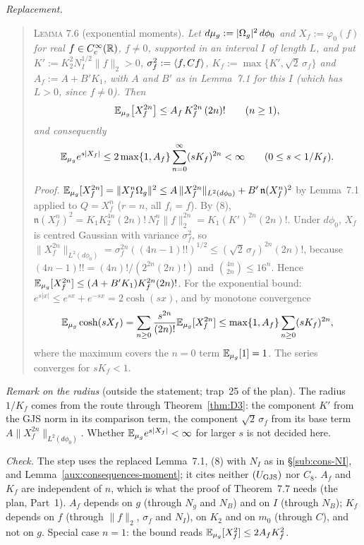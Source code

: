\emph{Replacement.}
\begin{quote}\small
\textsc{Lemma 7.6} (exponential moments).  \emph{Let $d\mu_g:=|\Omega_g|^2\,d\phi_0$ and
$X_f:=\varphi_0(f)$ for real $f\in C_c^\infty(\mathbb{R})$, $f\ne0$, supported in an interval $I$ of
length $L$, and put $K':=K_2^{2}N_I^{1/2}\|f\|_2>0$, $\sigma_f^2:=\langle f,Cf\rangle$,
$K_f:=\max\{K',\sqrt2\,\sigma_f\}$ and $A_f:=A+B'K_1$, with $A$ and $B'$ as in Lemma~7.1 for this
$I$ (which has $L>0$, since $f\ne0$).  Then}
\[
 \mathbb{E}_{\mu_g}\bigl[X_f^{2n}\bigr]\le A_f\,K_f^{2n}\,(2n)!\qquad(n\ge1),
\]
\emph{and consequently}
\[
 \mathbb{E}_{\mu_g}e^{s|X_f|}\le2\max\{1,A_f\}\sum_{n=0}^\infty(sK_f)^{2n}<\infty\qquad(0\le s<1/K_f).
\]

\emph{Proof.}  $\mathbb{E}_{\mu_g}[X_f^{2n}]=\|X_f^n\Omega_g\|^2\le A\,\|X_f^{2n}\|_{L^2(d\phi_0)}+B'\,
\mathfrak n(X_f^n)^2$ by Lemma~7.1 applied to $Q=X_f^n$ ($r=n$, all $f_i=f$).  By (8),
$\mathfrak n(X_f^n)^2=K_1K_2^{4n}(2n)!\,N_I^n\|f\|_2^{2n}=K_1(K')^{2n}(2n)!$.  Under $d\phi_0$,
$X_f$ is centred Gaussian with variance $\sigma_f^2$, so
$\|X_f^{2n}\|_{L^2(d\phi_0)}=\sigma_f^{2n}((4n-1)!!)^{1/2}\le(\sqrt2\,\sigma_f)^{2n}(2n)!$, because
$(4n-1)!!=(4n)!/(2^{2n}(2n)!)$ and $\binom{4n}{2n}\le16^n$.  Hence
$\mathbb{E}_{\mu_g}[X_f^{2n}]\le(A+B'K_1)K_f^{2n}(2n)!$.  For the exponential bound: $e^{s|x|}\le
e^{sx}+e^{-sx}=2\cosh(sx)$, and by monotone convergence
\[
 \mathbb{E}_{\mu_g}\cosh(sX_f)=\sum_{n\ge0}\frac{s^{2n}}{(2n)!}\mathbb{E}_{\mu_g}[X_f^{2n}]
 \le\max\{1,A_f\}\sum_{n\ge0}(sK_f)^{2n},
\]
where the maximum covers the $n=0$ term $\mathbb{E}_{\mu_g}[1]=1$.  The series converges for $sK_f<1$.
\end{quote}
\emph{Remark on the radius} (outside the statement; trap~25 of the plan).  The radius $1/K_f$
comes from the route through Theorem~\ref{thm:D3}: the component $K'$ from the GJS norm in its
comparison term, the component $\sqrt2\,\sigma_f$ from its base term $A\|X_f^{2n}\|_{L^2(d\phi_0)}$.
Whether $\mathbb{E}_{\mu_g}e^{s|X_f|}<\infty$ for larger $s$ is not decided here.

\emph{Check.}  The step uses the replaced Lemma~7.1, (8) with $N_I$ as in \S\ref{sub:cons-NI}, and
Lemma~\ref{aux:consequences-moment}; it cites neither $(U_{\rm GJS})$ nor $C_8$.  $A_f$ and $K_f$ are
independent of $n$, which is what the proof of Theorem~7.7 needs (the plan, Part~1).  $A_f$
depends on $g$ (through $N_g$ and $N_B$) and on $I$ (through $N_B$); $K_f$ depends on $f$
(through $\|f\|_2$, $\sigma_f$ and $N_I$), on $K_2$ and on $m_0$ (through $C$), and not on $g$.
Special case $n=1$: the bound reads $\mathbb{E}_{\mu_g}[X_f^2]\le2A_fK_f^2$.

